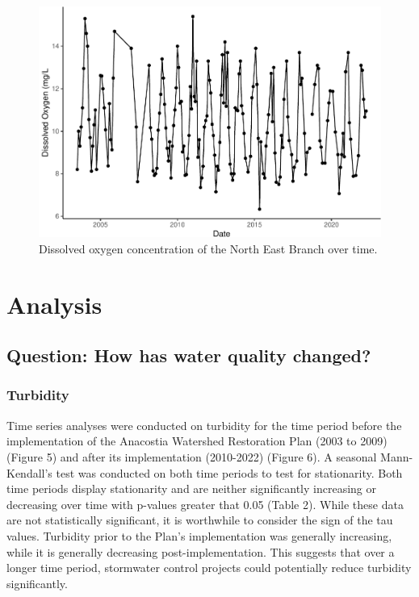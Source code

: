 \documentclass[
  12pt,
]{article}
\begin{document}
\begin{figure}

\includegraphics{Project_Template_files/figure-latex/Dissolved oxygen over time-1} \hfill{}

\caption{Dissolved oxygen concentration of the North East Branch over time.}\label{fig:Dissolved oxygen over time}
\end{figure}

\newpage

\hypertarget{analysis}{%
\section{Analysis}\label{analysis}}

\hypertarget{question-how-has-water-quality-changed}{%
\subsection{Question: How has water quality
changed?}\label{question-how-has-water-quality-changed}}

\hypertarget{turbidity}{%
\subsubsection{Turbidity}\label{turbidity}}

Time series analyses were conducted on turbidity for the time period
before the implementation of the Anacostia Watershed Restoration Plan
(2003 to 2009) (Figure 5) and after its implementation (2010-2022)
(Figure 6). A seasonal Mann-Kendall's test was conducted on both time
periods to test for stationarity. Both time periods display stationarity
and are neither significantly increasing or decreasing over time with
p-values greater that 0.05 (Table 2). While these data are not
statistically significant, it is worthwhile to consider the sign of the
tau values. Turbidity prior to the Plan's implementation was generally
increasing, while it is generally decreasing post-implementation. This
suggests that over a longer time period, stormwater control projects
could potentially reduce turbidity significantly.
\end{document}
